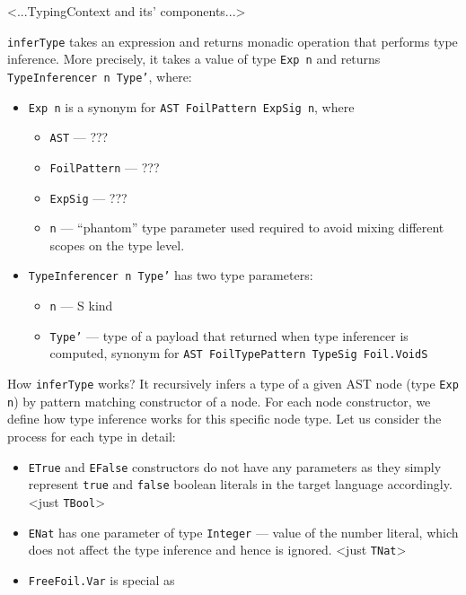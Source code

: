 <...TypingContext and its' components...>

\texttt{inferType} takes an expression and returns monadic operation that performs type inference. More precisely, it takes a value of type \texttt{Exp n} and returns \texttt{TypeInferencer n Type'}, where:

\begin{itemize}
  \item \texttt{Exp n} is a synonym for \texttt{AST FoilPattern ExpSig n}, where
  \begin{itemize}
    \item \texttt{AST} — ???
    \item \texttt{FoilPattern} — ???
    \item \texttt{ExpSig} — ???
    \item \texttt{n} — ``phantom'' type parameter used required to avoid mixing different scopes on the type level.
  \end{itemize}
  \item \texttt{TypeInferencer n Type'} has two type parameters:
  \begin{itemize}
    \item \texttt{n} — S kind
    \item \texttt{Type'} — type of a payload that returned when type inferencer is computed, synonym for \texttt{AST FoilTypePattern TypeSig Foil.VoidS}
  \end{itemize}
\end{itemize}

How \texttt{inferType} works? It recursively infers a type of a given AST node (type \texttt{Exp n}) by pattern matching constructor of a node. For each node constructor, we define how type inference works for this specific node type. Let us consider the process for each type in detail:

\begin{itemize}
  \item \texttt{ETrue} and \texttt{EFalse} constructors do not have any parameters as they simply represent \texttt{true} and \texttt{false} boolean literals in the target language accordingly. \textless just \texttt{TBool}\textgreater
  \item \texttt{ENat} has one parameter of type \texttt{Integer} — value of the number literal, which does not affect the type inference and hence is ignored. \textless just \texttt{TNat}\textgreater
  \item \texttt{FreeFoil.Var} is special as
\end{itemize}


